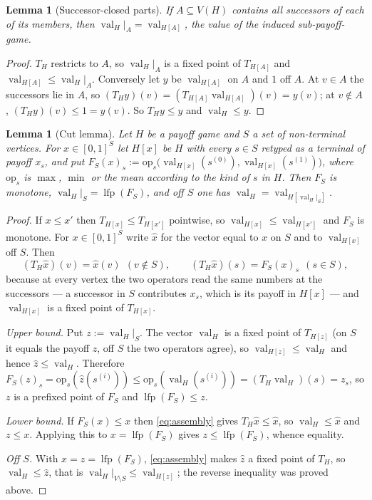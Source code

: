 \documentclass[11pt]{article}
\theoremstyle{plain}
\newtheorem{lemma}[theorem]{Lemma}
\theoremstyle{definition}
\DeclareMathOperator{\val}{val}
\DeclareMathOperator{\lfp}{lfp}
\begin{document}
\begin{lemma}[Successor-closed parts]\label{lem:successor-closed}
If $A\subseteq V(H)$ contains all successors of each of its members, then
$\val_H|_A=\val_{H[A]}$, the value of the induced sub-payoff-game.
\end{lemma}

\begin{proof}
$T_H$ restricts to $A$, so $\val_H|_A$ is a fixed point of $T_{H[A]}$ and
$\val_{H[A]}\le\val_H|_A$. Conversely let $y$ be $\val_{H[A]}$ on $A$ and
$1$ off $A$. At $v\in A$ the successors lie in $A$, so
$(T_Hy)(v)=(T_{H[A]}\val_{H[A]})(v)=y(v)$; at $v\notin A$,
$(T_Hy)(v)\le1=y(v)$. So $T_Hy\le y$ and $\val_H\le y$.
\end{proof}

\begin{lemma}[Cut lemma]\label{lem:cut}
Let $H$ be a payoff game and $S$ a set of non-terminal vertices. For
$x\in[0,1]^{S}$ let $H[x]$ be $H$ with every $s\in S$ retyped as a
terminal of payoff $x_s$, and put
$F_S(x)_s:=\mathrm{op}_s\bigl(\val_{H[x]}(s^{(0)}),\val_{H[x]}(s^{(1)})\bigr)$,
where $\mathrm{op}_s$ is $\max$, $\min$ or the mean according to the kind
of $s$ in $H$. Then $F_S$ is monotone, $\val_H|_S=\lfp(F_S)$, and off $S$
one has $\val_H=\val_{H[\val_H|_S]}$.
\end{lemma}

\begin{proof}
If $x\le x'$ then $T_{H[x]}\le T_{H[x']}$ pointwise, so
$\val_{H[x]}\le\val_{H[x']}$ and $F_S$ is monotone. For $x\in[0,1]^{S}$
write $\hat x$ for the vector equal to $x$ on $S$ and to $\val_{H[x]}$ off
$S$. Then
\begin{equation}\label{eq:assembly}
  (T_H\hat x)(v)=\hat x(v)\ \ (v\notin S),\qquad
  (T_H\hat x)(s)=F_S(x)_s\ \ (s\in S),
\end{equation}
because at every vertex the two operators read the same numbers at the
successors --- a successor in $S$ contributes $x_s$, which is its payoff
in $H[x]$ --- and $\val_{H[x]}$ is a fixed point of $T_{H[x]}$.

\emph{Upper bound.} Put $z:=\val_H|_S$. The vector $\val_H$ is a fixed
point of $T_{H[z]}$ (on $S$ it equals the payoff $z$, off $S$ the two
operators agree), so $\val_{H[z]}\le\val_H$ and hence $\hat z\le\val_H$.
Therefore
$F_S(z)_s=\mathrm{op}_s(\hat z(s^{(i)}))\le\mathrm{op}_s(\val_H(s^{(i)}))
=(T_H\val_H)(s)=z_s$, so $z$ is a prefixed point of $F_S$ and
$\lfp(F_S)\le z$.

\emph{Lower bound.} If $F_S(x)\le x$ then \eqref{eq:assembly} gives
$T_H\hat x\le\hat x$, so $\val_H\le\hat x$ and $z\le x$. Applying this to
$x=\lfp(F_S)$ gives $z\le\lfp(F_S)$, whence equality.

\emph{Off $S$.} With $x=z=\lfp(F_S)$, \eqref{eq:assembly} makes $\hat z$ a
fixed point of $T_H$, so $\val_H\le\hat z$, that is
$\val_H|_{V\setminus S}\le\val_{H[z]}$; the reverse inequality was proved
above.
\end{proof}
\end{document}
